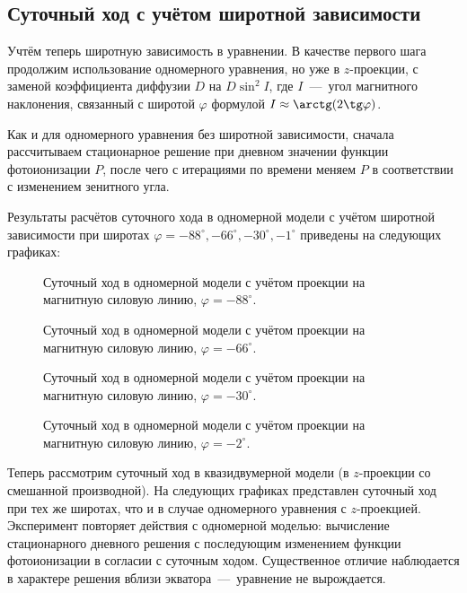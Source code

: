 \documentclass[14pt, a4paper, fleqn]{extarticle}
\begin{document}
\subsection{Суточный ход с учётом широтной зависимости}


Учтём теперь широтную зависимость в уравнении. В качестве первого шага продолжим использование одномерного уравнения, но уже в $z$-проекции, с заменой коэффициента диффузии $D$ на $D\sin^2I$, где $I$~---~угол магнитного наклонения, связанный с широтой $\varphi$ формулой $I\approx \arctg(2\tg \varphi)$.

Как и для одномерного уравнения без широтной зависимости, сначала рассчитываем стационарное решение при дневном значении функции фотоионизации $P$, после чего с итерациями по времени меняем $P$ в соответствии с изменением зенитного угла.

Результаты расчётов суточного хода в одномерной модели с учётом широтной зависимости при широтах $\varphi = -88^\circ, -66^\circ, -30^\circ, -1^\circ$ приведены на следующих графиках:

\begin{figure}[H]
\caption{Суточный ход в одномерной модели с учётом проекции на магнитную силовую линию, $\varphi = -88^\circ$.}
\end{figure}

\begin{figure}[H]
\caption{Суточный ход в одномерной модели с учётом проекции на магнитную силовую линию, $\varphi = -66^\circ$.}
\end{figure}

\begin{figure}[H]
\caption{Суточный ход в одномерной модели с учётом проекции на магнитную силовую линию, $\varphi = -30^\circ$.}
\end{figure}

\begin{figure}[H]
\caption{Суточный ход в одномерной модели с учётом проекции на магнитную силовую линию, $\varphi = -2^\circ$.}
\end{figure}



Теперь рассмотрим суточный ход в квазидвумерной модели (в $z$-проекции со смешанной производной). На следующих графиках представлен суточный ход при тех же широтах, что и в случае одномерного уравнения с $z$-проекцией. Эксперимент повторяет действия с одномерной моделью: вычисление стационарного дневного решения с последующим изменением функции фотоионизации в согласии с суточным ходом. Существенное отличие наблюдается в характере решения вблизи экватора~---~уравнение не вырождается. 
\end{document}

